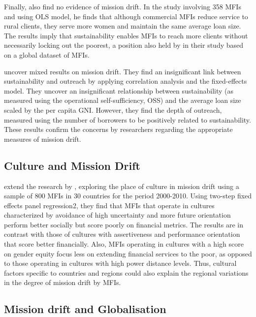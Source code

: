 \documentclass[a4paper, nobind]{templates/ociamthesis}
\begin{document}
Finally, \textcite{roberts2013profit} also find no evidence of mission drift. In the study involving 358 MFIs and using OLS model, he finds that although commercial MFIs reduce service to rural clients, they serve more women and maintain the same average loan size. The results imply that sustainability enables MFIs to reach more clients without necessarily locking out the poorest, a position also held by \textcite{nurmakhanova2015trade} in their study based on a global dataset of MFIs.

\textcite{abdulai2017trade} uncover mixed results on mission drift. They find an insignificant link between sustainability and outreach by applying correlation analysis and the fixed-effects model. They uncover an insignificant relationship between sustainability (as measured using the operational self-sufficiency, OSS) and the average loan size scaled by the per capita GNI. However, they find the depth of outreach, measured using the number of borrowers to be positively related to sustainability. These results confirm the concerns by researchers regarding the appropriate measures of mission drift.

\hypertarget{culture-and-mission-drift}{%
\subsection{Culture and Mission Drift}\label{culture-and-mission-drift}}

\noindent \textcite{manos2014determinants} extend the research by \textcite{abdulai2017trade}, exploring the place of culture in mission drift using a sample of 800 MFIs in 30 countries for the period 2000-2010. Using two-step fixed effects panel regression2, they find that MFIs that operate in cultures characterized by avoidance of high uncertainty and more future orientation perform better socially but score poorly on financial metrics. The results are in contrast with those of cultures with assertiveness and performance orientation that score better financially. Also, MFIs operating in cultures with a high score on gender equity focus less on extending financial services to the poor, as opposed to those operating in cultures with high power distance levels. Thus, cultural factors specific to countries and regions could also explain the regional variations in the degree of mission drift by MFIs.

\hypertarget{mission-drift-and-globalisation}{%
\subsection{Mission drift and Globalisation}\label{mission-drift-and-globalisation}}
\end{document}
